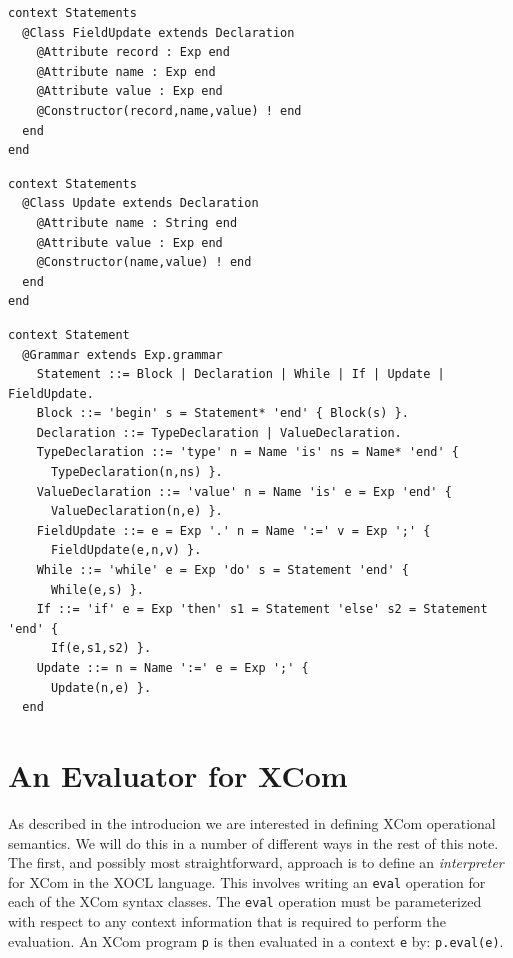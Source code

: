 \documentclass{article}
\begin{document}
\begin{verbatim}
context Statements
  @Class FieldUpdate extends Declaration
    @Attribute record : Exp end
    @Attribute name : Exp end
    @Attribute value : Exp end
    @Constructor(record,name,value) ! end
  end
end
\end{verbatim}

\begin{verbatim}
context Statements
  @Class Update extends Declaration
    @Attribute name : String end
    @Attribute value : Exp end
    @Constructor(name,value) ! end
  end
end
\end{verbatim}

\begin{verbatim}
context Statement
  @Grammar extends Exp.grammar
    Statement ::= Block | Declaration | While | If | Update | FieldUpdate.
    Block ::= 'begin' s = Statement* 'end' { Block(s) }.
    Declaration ::= TypeDeclaration | ValueDeclaration.
    TypeDeclaration ::= 'type' n = Name 'is' ns = Name* 'end' { 
      TypeDeclaration(n,ns) }.
    ValueDeclaration ::= 'value' n = Name 'is' e = Exp 'end' { 
      ValueDeclaration(n,e) }.
    FieldUpdate ::= e = Exp '.' n = Name ':=' v = Exp ';' {
      FieldUpdate(e,n,v) }.
    While ::= 'while' e = Exp 'do' s = Statement 'end' {
      While(e,s) }.
    If ::= 'if' e = Exp 'then' s1 = Statement 'else' s2 = Statement 'end' {
      If(e,s1,s2) }.
    Update ::= n = Name ':=' e = Exp ';' {
      Update(n,e) }.
  end
\end{verbatim}

\section{An Evaluator for XCom}

As described in the introducion we are interested in defining XCom operational
semantics. We will do this in a number of different ways in the rest of this note.
The first, and possibly most straightforward, approach is to define an {\em interpreter} for
XCom in the XOCL language. This involves writing an {\tt eval} operation for each of the
XCom syntax classes. The {\tt eval} operation must be parameterized with respect to
any context information that is required to perform the evaluation. An XCom program {\tt p}
is then evaluated in a context {\tt e} by: {\tt p.eval(e)}.
\end{document}
